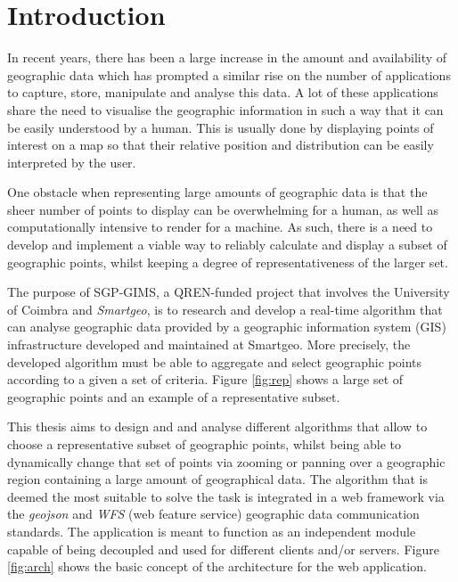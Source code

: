 \pagestyle{mypagestyle}

\setcounter{page}{1}

\cleardoublepage
\chapter{Introduction}
\label{chap:intro}
\vspace{-15pt}
In recent years, there has been a large increase in the amount and availability of geographic data which has prompted a similar rise on the number of applications to capture, store, manipulate and analyse this data.
A lot of these applications share the need to visualise the geographic information in such a way that it can be easily understood by a human.
This is usually done by displaying points of interest on a map so that their relative position and distribution can be easily interpreted by the user.

One obstacle when representing large amounts of geographic data is that the sheer number of points to display can be overwhelming for a human, as well as computationally intensive to render for a machine. As such, there is a need to develop and implement a viable way to reliably calculate and display a subset of geographic points, whilst keeping a degree of representativeness of the larger set.

The purpose of SGP-GIMS, a QREN-funded project that involves the University of Coimbra and \emph{Smartgeo}, is to research and develop a real-time algorithm that can analyse geographic data provided by a geographic information system (GIS) infrastructure developed and maintained at Smartgeo. More precisely, the developed algorithm must be able to aggregate and select geographic points according to a given a set of criteria. Figure \ref{fig:rep} shows a large set of geographic points and an example of a representative subset.



This thesis aims to design and and analyse different algorithms that allow to choose a representative subset of geographic points, whilst being able to dynamically change that set of points via zooming or panning over a geographic region containing a large amount of geographical data. 
The algorithm that is deemed the most suitable to solve the task is integrated in a web framework via the \emph{geojson} and \emph{WFS} (web feature service) geographic data communication standards. The application is meant to function as an independent module capable of being decoupled and used for different clients and/or servers. Figure \ref{fig:arch} shows the basic concept of the architecture for the web application.

